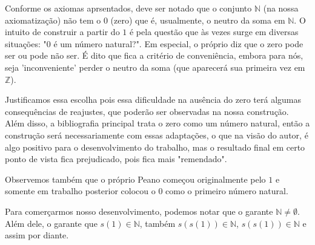 \documentclass[../main.tex]{subfiles}
\begin{document}
Conforme os axiomas aprsentados, deve ser notado que o conjunto $\mathbb{N}$ (na nossa axiomatização) não tem o $0$ (zero) que é, usualmente, o neutro da soma em $\mathbb{N}$. O intuito de construir a partir do $1$ é pela questão que às vezes surge em diversas situações: "$0$ é um número natural?". Em especial, o próprio \textcite{lima-site} diz que o zero pode ser ou pode não ser. É dito que fica a critério de conveniência, embora para nós, seja 'inconveniente' perder o neutro da soma (que aparecerá sua primeira vez em $\mathbb{Z}$). 

Justificamos essa escolha pois essa dificuldade na ausência do zero terá algumas consequências de reajustes, que poderão ser observadas na nossa construção. Além disso, a bibliografia principal trata o zero como um número natural, então a construção será necessariamente com essas adaptações, o que na visão do autor, é algo positivo para o desenvolvimento do trabalho, mas o resultado final em certo ponto de vista fica prejudicado, pois fica mais "remendado".

Observemos também que o próprio Peano começou originalmente pelo $1$ e somente em trabalho posterior colocou o $0$ como o primeiro número natural.

Para comerçarmos nosso desenvolvimento, podemos notar que o  garante $\mathbb{N} \neq \emptyset $. Além dele, o  garante que $s(1) \in \mathbb{N}$, também $s(s(1)) \in \mathbb{N}$, $s(s(1)) \in \mathbb{N}$ e assim por diante.
\end{document}

